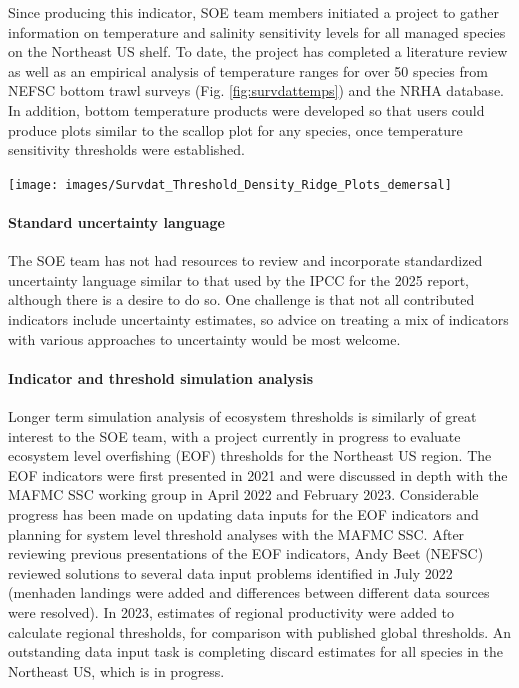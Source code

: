 \documentclass[
  10pt,
]{article}
\let\origfigure\figure
\let\endorigfigure\endfigure
\renewenvironment{figure}[1][2] {
    \expandafter\origfigure\expandafter[H]
} {
    \endorigfigure
}
\begin{document}
Since producing this indicator, SOE team members initiated a project to
gather information on temperature and salinity sensitivity levels for
all managed species on the Northeast US shelf. To date, the project has
completed a literature review as well as an empirical analysis of
temperature ranges for over 50 species from NEFSC bottom trawl surveys
(Fig. \ref{fig:survdattemps}) and the NRHA database. In addition, bottom
temperature products were developed so that users could produce plots
similar to the scallop plot for any species, once temperature
sensitivity thresholds were established.

\begin{figure}

{\centering \texttt{[image: images/Survdat\_Threshold\_Density\_Ridge\_Plots\_demersal]} 

}

\caption{Observed bottom temperature ranges for NEFSC bottom trawl survey species}\label{fig:survdattemps}
\end{figure}

\hypertarget{standard-uncertainty-language}{%
\paragraph{Standard uncertainty
language}\label{standard-uncertainty-language}}

The SOE team has not had resources to review and incorporate
standardized uncertainty language similar to that used by the IPCC for
the 2025 report, although there is a desire to do so. One challenge is
that not all contributed indicators include uncertainty estimates, so
advice on treating a mix of indicators with various approaches to
uncertainty would be most welcome.

\hypertarget{indicator-and-threshold-simulation-analysis}{%
\paragraph{Indicator and threshold simulation
analysis}\label{indicator-and-threshold-simulation-analysis}}

Longer term simulation analysis of ecosystem thresholds is similarly of
great interest to the SOE team, with a project currently in progress to
evaluate ecosystem level overfishing (EOF) thresholds for the Northeast
US region. The EOF indicators were first presented in 2021 and were
discussed in depth with the MAFMC SSC working group in April 2022 and
February 2023. Considerable progress has been made on updating data
inputs for the EOF indicators and planning for system level threshold
analyses with the MAFMC SSC. After reviewing previous presentations of
the EOF indicators, Andy Beet (NEFSC) reviewed solutions to several data
input problems identified in July 2022 (menhaden landings were added and
differences between different data sources were resolved). In 2023,
estimates of regional productivity were added to calculate regional
thresholds, for comparison with published global thresholds. An
outstanding data input task is completing discard estimates for all
species in the Northeast US, which is in progress.
\end{document}
